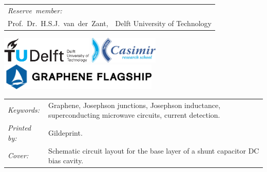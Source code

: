 \begin{titlepage}
\begin{tabular}{p{3.5cm}l}
    \medskip
    \mbox{\emph{Reserve member:}} & \\

    Prof.~Dr.~H.S.J.~van~der~Zant, & Delft University of Technology \\

    
\end{tabular}


\vfill
\begin{center}
    \centering
    \includegraphics[height=0.5in]{title/logos/tudelft}
    \hspace{2em}
    \includegraphics[height=0.5in]{title/logos/casimir}
    \vspace{0.5cm}\newline
    \includegraphics[height=0.5in]{title/logos/flagship}
\end{center}
\vfill

\noindent
\begin{tabular}{@{}p{}@{}p{}}
    \textit{Keywords:} & Graphene, Josephson junctions, Josephson inductance, superconducting microwave circuits, current detection. \\
    \textit{Printed by:} &  Gildeprint. \\
    \textit{Cover:} & Schematic circuit layout for the base layer of a shunt capacitor DC bias cavity.
\end{tabular}


\end{titlepage}
